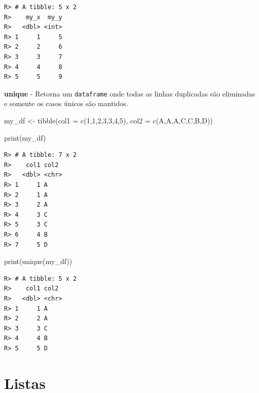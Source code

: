 \documentclass[
  11pt,
]{book}
\newenvironment{Shaded}{\begin{snugshade}}{\end{snugshade}}
\newcommand{\AttributeTok}[1]{\textcolor[rgb]{0.61,0.61,0.61}{#1}}
\newcommand{\DecValTok}[1]{\textcolor[rgb]{0.06,0.06,0.06}{#1}}
\newcommand{\FunctionTok}[1]{\textcolor[rgb]{0,0,0}{#1}}
\newcommand{\NormalTok}[1]{#1}
\newcommand{\OtherTok}[1]{\textcolor[rgb]{0.37,0.37,0.37}{#1}}
\newcommand{\StringTok}[1]{\textcolor[rgb]{0.5,0.5,0.5}{#1}}
\begin{document}
\begin{verbatim}
R> # A tibble: 5 x 2
R>    my_x  my_y
R>   <dbl> <int>
R> 1     1     5
R> 2     2     6
R> 3     3     7
R> 4     4     8
R> 5     5     9
\end{verbatim}

\textbf{unique} - Retorna um \texttt{dataframe} onde todas as linhas duplicadas são eliminadas e somente os casos únicos são mantidos.

\begin{Shaded}
\begin{Highlighting}[]
\NormalTok{my\_df }\OtherTok{\textless{}{-}} \FunctionTok{tibble}\NormalTok{(}\AttributeTok{col1 =} \FunctionTok{c}\NormalTok{(}\DecValTok{1}\NormalTok{,}\DecValTok{1}\NormalTok{,}\DecValTok{2}\NormalTok{,}\DecValTok{3}\NormalTok{,}\DecValTok{3}\NormalTok{,}\DecValTok{4}\NormalTok{,}\DecValTok{5}\NormalTok{),}
                \AttributeTok{col2 =} \FunctionTok{c}\NormalTok{(}\StringTok{\textquotesingle{}A\textquotesingle{}}\NormalTok{,}\StringTok{\textquotesingle{}A\textquotesingle{}}\NormalTok{,}\StringTok{\textquotesingle{}A\textquotesingle{}}\NormalTok{,}\StringTok{\textquotesingle{}C\textquotesingle{}}\NormalTok{,}\StringTok{\textquotesingle{}C\textquotesingle{}}\NormalTok{,}\StringTok{\textquotesingle{}B\textquotesingle{}}\NormalTok{,}\StringTok{\textquotesingle{}D\textquotesingle{}}\NormalTok{))}

\FunctionTok{print}\NormalTok{(my\_df)}
\end{Highlighting}
\end{Shaded}

\begin{verbatim}
R> # A tibble: 7 x 2
R>    col1 col2 
R>   <dbl> <chr>
R> 1     1 A    
R> 2     1 A    
R> 3     2 A    
R> 4     3 C    
R> 5     3 C    
R> 6     4 B    
R> 7     5 D
\end{verbatim}

\begin{Shaded}
\begin{Highlighting}[]
\FunctionTok{print}\NormalTok{(}\FunctionTok{unique}\NormalTok{(my\_df))}
\end{Highlighting}
\end{Shaded}

\begin{verbatim}
R> # A tibble: 5 x 2
R>    col1 col2 
R>   <dbl> <chr>
R> 1     1 A    
R> 2     2 A    
R> 3     3 C    
R> 4     4 B    
R> 5     5 D
\end{verbatim}

\hypertarget{listas}{%
\section{Listas}\label{listas}}
\end{document}
